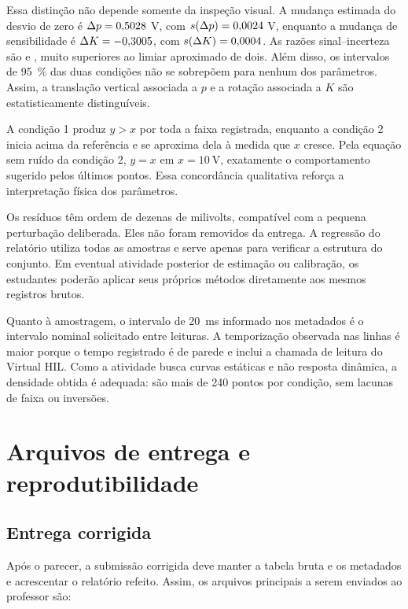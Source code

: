 \documentclass[12pt,a4paper]{article}
\begin{document}
Essa distinção não depende somente da inspeção visual. A mudança estimada do desvio de zero é $\Delta p=0{,}5028$ V, com $s(\Delta p)=0{,}0024$ V, enquanto a mudança de sensibilidade é $\Delta K=-0{,}3005$, com $s(\Delta K)=0{,}0004$. As razões sinal--incerteza são \RazaoDeltaB{} e \RazaoDeltaK, muito superiores ao limiar aproximado de dois. Além disso, os intervalos de \SI{95}{\percent} das duas condições não se sobrepõem para nenhum dos parâmetros. Assim, a translação vertical associada a $p$ e a rotação associada a $K$ são estatisticamente distinguíveis.

A condição 1 produz $y>x$ por toda a faixa registrada, enquanto a condição 2 inicia acima da referência e se aproxima dela à medida que $x$ cresce. Pela equação sem ruído da condição 2, $y=x$ em $x=\SI{10}{\volt}$, exatamente o comportamento sugerido pelos últimos pontos. Essa concordância qualitativa reforça a interpretação física dos parâmetros.

Os resíduos têm ordem de dezenas de milivolts, compatível com a pequena perturbação deliberada. Eles não foram removidos da entrega. A regressão do relatório utiliza todas as amostras e serve apenas para verificar a estrutura do conjunto. Em eventual atividade posterior de estimação ou calibração, os estudantes poderão aplicar seus próprios métodos diretamente aos mesmos registros brutos.

Quanto à amostragem, o intervalo de \SI{20}{\milli\second} informado nos metadados é o intervalo nominal solicitado entre leituras. A temporização observada nas linhas é maior porque o tempo registrado é de parede e inclui a chamada de leitura do Virtual HIL. Como a atividade busca curvas estáticas e não resposta dinâmica, a densidade obtida é adequada: são mais de 240 pontos por condição, sem lacunas de faixa ou inversões.

\section{Arquivos de entrega e reprodutibilidade}

\subsection{Entrega corrigida}

Após o parecer, a submissão corrigida deve manter a tabela bruta e os metadados e acrescentar o relatório refeito. Assim, os arquivos principais a serem enviados ao professor são:
\end{document}
